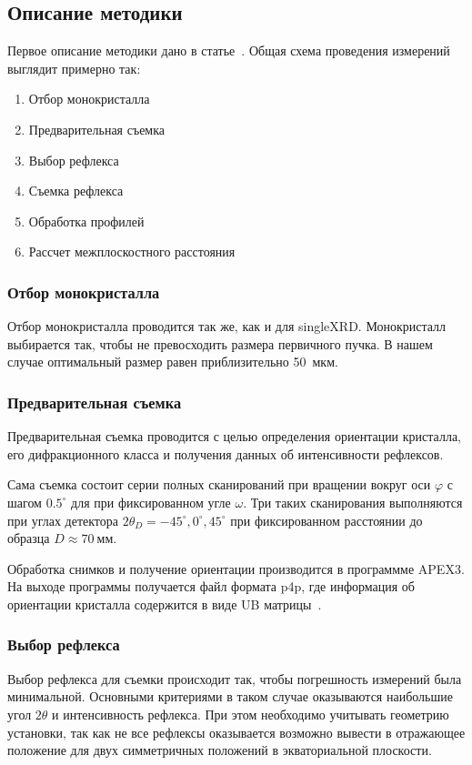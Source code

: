 \documentclass[a4paper, 12pt]{article}
\begin{document}
\subsection{Описание методики}
Первое описание методики дано в статье~\cite{Kudryavtsev:2024:1}.
Общая схема проведения измерений выглядит примерно так:
\begin{enumerate}
    \item Отбор монокристалла
    \item Предварительная съемка
    \item Выбор рефлекса
    \item Съемка рефлекса
    \item Обработка профилей
    \item Рассчет межплоскостного расстояния
\end{enumerate}
\subsubsection{Отбор монокристалла}
Отбор монокристалла проводится так же, как и для \gls{singleXRD}.
Монокристалл выбирается так, чтобы не превосходить размера первичного пучка.
В нашем случае оптимальный размер равен приблизительно 50~мкм.
\subsubsection{Предварительная съемка}
Предварительная съемка проводится с целью определения ориентации кристалла, его дифракционного класса и получения данных об интенсивности рефлексов.

Сама съемка состоит серии полных сканирований при вращении вокруг оси $\varphi$ с шагом $0.5^\circ$ для при фиксированном угле $\omega$.
Три таких сканирования выполняются при углах детектора $2\theta_D = -45^\circ, 0^\circ, 45^\circ$ при фиксированном расстоянии до образца $D \approx 70 \ \text{мм}$.

Обработка снимков и получение ориентации производится в программме APEX3.
На выходе программы получается файл формата p4p, где информация об ориентации кристалла содержится в виде UB матрицы~\cite{Busing:1967}.
\subsubsection{Выбор рефлекса}
Выбор рефлекса для съемки происходит так, чтобы погрешность измерений была минимальной.
Основными критериями в таком случае оказываются наибольшие угол $2\theta$ и интенсивность рефлекса.
При этом необходимо учитывать геометрию установки, так как не все рефлексы оказывается возможно вывести в отражающее положение для двух симметричных положений в экваториальной плоскости.
\end{document}
